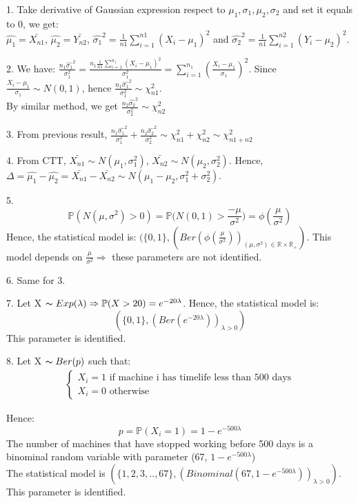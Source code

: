 \documentclass[10pt]{article}
\newenvironment{problem}[2][Problem]{\begin{trivlist}
\item[\hskip \labelsep {\bfseries #1}\hskip \labelsep {\bfseries #2.}]}{\end{trivlist}}
\begin{document}
\begin{problem}{2}
\item 1.
Take derivative of Gaussian expression respect to $\mu_1, \sigma_1, \mu_2, \sigma_2$ and set it equals to 0, we get:\\
$\hat{\mu_1}=\bar{X_{n1}}$, $\hat{\mu_2}=\bar{Y_{n2}}$, $\hat{\sigma_1}^2=\frac{1}{n1}\sum_{i=1}^{n1} (X_i-\mu_1)^2$ and $\hat{\sigma_2}^2=\frac{1}{n1}\sum_{i=1}^{n2} (Y_i-\mu_2)^2$.

\item 2.
We have: $\frac{n_1\hat{\sigma_1}^2}{\sigma_1^2}=\frac{n_1\frac{1}{n1}\sum_{i=1}^{n_1} (X_i-\mu_1)^2}{\sigma_1^2}=\sum_{i=1}^{n_1}(\frac{X_i-\mu_1}{\sigma_1})^2$. Since $\frac{X_i-\mu_1}{\sigma_1}\sim N(0,1)$, hence $\frac{n_1\hat{\sigma_1}^2}{\sigma_1^2} \sim \chi_{n1}^2$.\\
By similar method, we get $\frac{n_2\hat{\sigma_2}^2}{\sigma_2^2} \sim \chi_{n2}^2$






\item 3.
From previous result, $\frac{n_1\hat{\sigma_1}^2}{\sigma_1^2} + \frac{n_2\hat{\sigma_2}^2}{\sigma_2^2} \sim \chi_{n1}^2 + \chi_{n2}^2 \sim \chi_{n1+n2}^2$


\item 4.
From CTT, $\bar{X_{n1}} \sim N(\mu_1, \sigma_1^2)$, $\bar{X_{n2}} \sim N(\mu_2, \sigma_2^2)$. Hence, $\Delta=\hat{\mu_1}-\hat{\mu_2}=\bar{X_{n1}}- \bar{X_{n2}} \sim N(\mu_1-\mu_2, \sigma_1^2+\sigma_2^2)$.
\item 5.
\[\mathbb{P}(N(\mu, \sigma^2)>0)=\mathbb{P}\Big( N(0,1) > \frac{-\mu}{\sigma^2} \Big)=\phi(\frac{\mu}{\sigma^2})\]
Hence, the statistical model is: $(\{0,1\}, (Ber(\phi(\frac{\mu}{\sigma^2}))_{(\mu, \sigma^2) \in \mathbb{R} \times \mathbb{R_+}})$. This model depends on $\frac{\mu}{\sigma^2} \Rightarrow$ these parameters are not identified.
\item 6.
Same for 3.
\item 7.
Let X $\thicksim Exp(\lambda) \Rightarrow \mathbb{P}(X>20)=e^{-20\lambda}$. Hence, the statistical model is:
\[(\{ 0,1\},(Ber(e^{-20\lambda}))_{\lambda>0}) \] 
This parameter is identified.

\item 8.
Let X $\thicksim Ber(p)$ such that:
\begin{align}
    \begin{cases}
        X_{i}=1 \text{ if machine i has timelife less than 500 days} \\
        X_{i}=0 \text{ otherwise}
    \end{cases}
\end{align}

Hence: 
\[p=\mathbb{P}(X_{i}=1)=1-e^{-500\lambda}\]
The number of machines that have stopped working before 500 days is a binominal random variable with parameter (67, $1-e^{-500\lambda}$)\\
The statistical model is $(\{1,2,3,..,67 \}, (Binominal(67, 1-e^{-500\lambda}))_{\lambda>0})$. This parameter is identified.

\end{problem}
\end{document}
